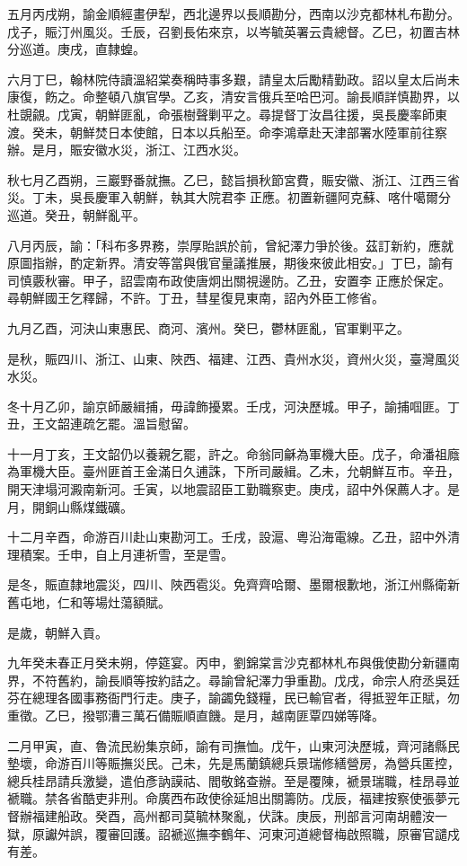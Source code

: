 \begin{pinyinscope}
五月丙戌朔，諭金順經畫伊犁，西北邊界以長順勘分，西南以沙克都林札布勘分。戊子，賑汀州風災。壬辰，召劉長佑來京，以岑毓英署云貴總督。乙巳，初置吉林分巡道。庚戌，直隸蝗。

六月丁巳，翰林院侍讀溫紹棠奏稱時事多艱，請皇太后勵精勤政。詔以皇太后尚未康復，飭之。命整頓八旗官學。乙亥，清安言俄兵至哈巴河。諭長順詳慎勘界，以杜覬覦。戊寅，朝鮮匪亂，命張樹聲剿平之。尋提督丁汝昌往援，吳長慶率師東渡。癸未，朝鮮焚日本使館，日本以兵船至。命李鴻章赴天津部署水陸軍前往察辦。是月，賑安徽水災，浙江、江西水災。

秋七月乙酉朔，三巖野番就撫。乙巳，懿旨損秋節宮費，賑安徽、浙江、江西三省災。丁未，吳長慶軍入朝鮮，執其大院君李正應。初置新疆阿克蘇、喀什噶爾分巡道。癸丑，朝鮮亂平。

八月丙辰，諭：「科布多界務，崇厚貽誤於前，曾紀澤力爭於後。茲訂新約，應就原圖指辦，酌定新界。清安等當與俄官量議推展，期後來彼此相安。」丁巳，諭有司慎覈秋審。甲子，詔雲南布政使唐炯出關視邊防。乙丑，安置李正應於保定。尋朝鮮國王乞釋歸，不許。丁丑，彗星復見東南，詔內外臣工修省。

九月乙酉，河決山東惠民、商河、濱州。癸巳，鬱林匪亂，官軍剿平之。

是秋，賑四川、浙江、山東、陜西、福建、江西、貴州水災，資州火災，臺灣風災水災。

冬十月乙卯，諭京師嚴緝捕，毋諱飾擾累。壬戌，河決歷城。甲子，諭捕啯匪。丁丑，王文韶連疏乞罷。溫旨慰留。

十一月丁亥，王文韶仍以養親乞罷，許之。命翁同龢為軍機大臣。戊子，命潘祖廕為軍機大臣。臺州匪首王金滿日久逋誅，下所司嚴緝。乙未，允朝鮮互市。辛丑，開天津塌河澱南新河。壬寅，以地震詔臣工勤職察吏。庚戌，詔中外保薦人才。是月，開銅山縣煤鐵礦。

十二月辛酉，命游百川赴山東勘河工。壬戌，設滬、粵沿海電線。乙丑，詔中外清理積案。壬申，自上月連祈雪，至是雪。

是冬，賑直隸地震災，四川、陜西雹災。免齊齊哈爾、墨爾根歉地，浙江州縣衛新舊屯地，仁和等場灶蕩額賦。

是歲，朝鮮入貢。

九年癸未春正月癸未朔，停筵宴。丙申，劉錦棠言沙克都林札布與俄使勘分新疆南界，不符舊約，諭長順等按約詰之。尋諭曾紀澤力爭重勘。戊戌，命宗人府丞吳廷芬在總理各國事務衙門行走。庚子，諭蠲免錢糧，民已輸官者，得抵翌年正賦，勿重徵。乙巳，撥鄂漕三萬石備賑順直饑。是月，越南匪覃四娣等降。

二月甲寅，直、魯流民紛集京師，諭有司撫恤。戊午，山東河決歷城，齊河諸縣民墊壞，命游百川等賑撫災民。己未，先是馬蘭鎮總兵景瑞修繕營房，為營兵匿控，總兵桂昂請兵激變，遣伯彥訥謨祜、閻敬銘查辦。至是覆陳，褫景瑞職，桂昂尋並褫職。禁各省酷吏非刑。命廣西布政使徐延旭出關籌防。戊辰，福建按察使張夢元督辦福建船政。癸酉，高州都司莫毓林聚亂，伏誅。庚辰，刑部言河南胡體洝一獄，原讞舛誤，覆審回護。詔褫巡撫李鶴年、河東河道總督梅啟照職，原審官譴戍有差。


\end{pinyinscope}
